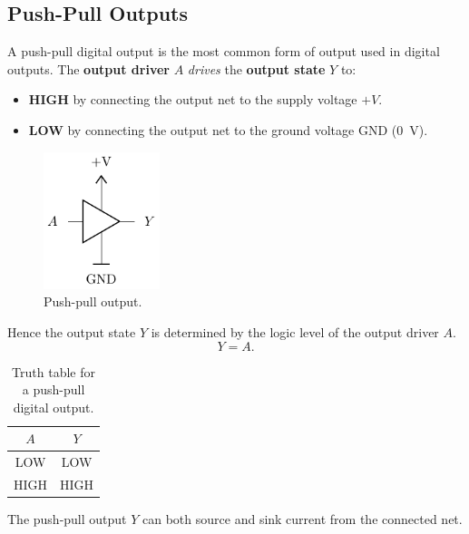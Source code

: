 \documentclass{report}
\begin{document}
\subsection{Push-Pull Outputs}
A push-pull digital output is the most common form of output used in digital outputs.
The \textbf{output driver} \(A\) \textit{drives} the \textbf{output state} \(Y\) to:
\begin{itemize}
    \item \textbf{HIGH} by connecting the output net to the supply voltage \(+\unit{V}\).
    \item \textbf{LOW} by connecting the output net to the ground voltage GND (\qty{0}{V}).
\end{itemize}
\begin{figure}[H]
    \centering
    \includegraphics[height = 4cm, keepaspectratio = true]{figures/push_pull.pdf}
    \caption{Push-pull output.} %
\end{figure}
Hence the output state \(Y\) is determined by the logic level of the output driver \(A\).
\begin{equation*}
    Y = A.
\end{equation*}
\begin{table}[H]
    \centering
    \begin{tabular}{c | c} %
        \toprule
        \textbf{\(A\)} & \textbf{\(Y\)} \\
        \midrule
        LOW            & LOW            \\
        HIGH           & HIGH           \\
        \bottomrule
    \end{tabular}
    \caption{Truth table for a push-pull digital output.} %
\end{table}
The push-pull output \(Y\) can both source and sink current from the connected net.
\end{document}
